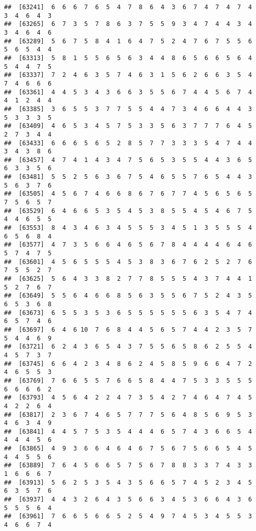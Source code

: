 \documentclass[
]{book}
\begin{document}
\begin{verbatim}
##  [63241]  6  6  6  7  6  5  4  7  8  6  4  3  6  7  4  7  4  7  4  3  4  6  4  3
##  [63265]  6  7  3  5  7  8  6  3  7  5  5  9  3  4  7  4  4  3  4  3  4  6  4  6
##  [63289]  5  6  7  5  8  4  1  6  4  7  5  2  4  7  6  7  5  5  6  5  6  5  4  4
##  [63313]  5  8  1  5  5  6  5  6  3  4  4  8  6  5  6  6  5  6  4  5  4  4  7  5
##  [63337]  7  2  4  6  3  5  7  4  6  3  1  5  6  2  6  6  3  5  4  7  4  6  6  6
##  [63361]  4  4  5  3  4  3  6  6  3  5  5  6  7  4  4  5  6  7  4  4  1  2  4  4
##  [63385]  3  6  5  5  3  7  7  5  5  4  4  7  3  4  6  6  4  4  3  5  3  3  3  5
##  [63409]  4  6  5  3  4  5  7  5  3  3  5  6  3  7  7  7  6  4  5  2  7  3  4  4
##  [63433]  6  6  6  5  6  5  2  8  5  7  7  3  3  3  5  4  7  4  4  3  4  3  8  6
##  [63457]  4  7  4  1  4  3  4  7  5  6  5  3  5  5  4  4  3  6  5  6  3  3  5  6
##  [63481]  5  5  2  5  6  3  6  7  5  4  6  5  5  7  6  5  4  4  3  5  6  3  7  6
##  [63505]  4  5  6  7  4  6  6  8  6  7  6  7  7  4  5  6  5  6  5  7  5  6  5  7
##  [63529]  6  4  6  6  5  3  5  4  5  3  8  5  5  4  5  4  6  7  5  4  4  6  5  5
##  [63553]  8  4  3  4  6  3  4  5  5  5  3  4  5  1  3  5  5  5  4  6  5  6  8  4
##  [63577]  4  7  3  5  6  6  4  6  5  6  7  8  4  4  4  4  6  4  6  5  7  4  7  5
##  [63601]  4  5  6  5  5  5  4  5  3  8  3  6  7  6  2  5  2  7  6  7  5  5  2  7
##  [63625]  5  6  4  3  3  8  2  7  7  8  5  5  5  4  3  7  4  4  1  5  2  7  6  7
##  [63649]  5  5  6  4  6  6  8  5  6  3  5  5  6  7  5  2  4  3  5  6  5  3  6  8
##  [63673]  6  5  5  3  5  3  6  5  5  5  5  5  5  6  3  5  4  7  4  6  5  7  4  6
##  [63697]  6  4  6 10  7  6  8  4  4  5  6  5  7  4  4  2  3  5  7  5  4  4  6  9
##  [63721]  6  2  4  3  6  5  4  3  7  5  5  6  5  8  6  2  5  5  4  4  5  7  3  7
##  [63745]  6  6  4  2  3  4  8  6  2  4  5  8  5  9  6  6  4  7  2  4  6  5  5  3
##  [63769]  7  6  6  5  5  7  6  6  5  8  4  4  7  5  3  3  5  5  5  6  6  6  6  2
##  [63793]  4  5  6  4  2  2  4  7  3  5  4  2  7  4  6  4  7  4  5  4  2  2  6  4
##  [63817]  2  3  6  7  4  6  5  7  7  7  5  6  4  8  5  6  9  5  3  4  6  3  4  9
##  [63841]  4  4  5  7  5  3  5  4  4  4  6  5  7  4  3  6  6  5  4  4  4  4  5  6
##  [63865]  4  9  3  6  6  4  6  4  6  7  5  6  7  5  6  6  5  4  5  4  4  5  5  6
##  [63889]  7  6  4  5  6  6  5  7  5  6  7  8  8  3  3  7  4  3  3  1  6  6  6  7
##  [63913]  5  6  2  5  3  5  4  3  5  6  6  5  7  4  5  2  3  4  5  6  3  5  7  6
##  [63937]  4  4  3  2  6  4  3  5  6  6  3  4  5  3  6  6  4  3  6  5  5  5  6  4
##  [63961]  7  6  6  5  6  6  5  2  5  4  9  7  4  5  3  4  5  5  3  4  6  6  7  4

\end{verbatim}
\end{document}
